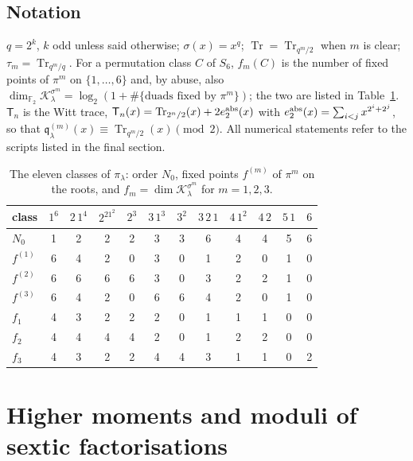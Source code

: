 \documentclass[12pt,a4paper]{amsart}
\theoremstyle{definition}
\newcommand{\F}{\mathbb{F}}
\newcommand{\Tr}{\operatorname{Tr}}
\newcommand{\Kk}{\mathcal{K}}
\newcommand{\qq}{\mathfrak{q}}
\newcommand{\Tw}{\mathsf{T}}
\begin{document}
\subsection{Notation}
$q=2^k$, $k$ odd unless said otherwise; $\sigma(x)=x^q$; $\Tr=\Tr_{q^m/2}$ when $m$ is clear; $\tau_m=\Tr_{q^m/q}$. For a permutation class $C$ of $S_6$, $f_m(C)$ is the number of fixed points of $\pi^m$ on $\{1,\dots,6\}$ and, by abuse, also $\dim_{\F_2}\Kk_\lambda^{\sigma^m}=\log_2(1+\#\{\text{duads fixed by }\pi^m\})$; the two are listed in Table~\ref{tab:classes}. $\Tw_n$ is the Witt trace, $\Tw_n(x)=\Tr_{2^n/2}(x)+2e_2^{\rm abs}(x)$ with $e_2^{\rm abs}(x)=\sum_{i<j}x^{2^i+2^j}$, so that $\qq^{(m)}_\lambda(x)\equiv\Tr_{q^m/2}(x)\pmod 2$. All numerical statements refer to the scripts listed in the final section.

\begin{table}[htbp]
\centering
\caption{The eleven classes of $\pi_\lambda$: order $N_0$, fixed points $f^{(m)}$ of $\pi^m$ on the roots, and $f_m=\dim\Kk_\lambda^{\sigma^m}$ for $m=1,2,3$.}\label{tab:classes}
\small
\begin{tabular}{@{}lccccccccccc@{}}
\toprule
class & $1^6$ & $2\,1^4$ & $2^21^2$ & $2^3$ & $3\,1^3$ & $3^2$ & $3\,2\,1$ & $4\,1^2$ & $4\,2$ & $5\,1$ & $6$\\
\midrule
$N_0$ & 1&2&2&2&3&3&6&4&4&5&6\\
$f^{(1)}$ &6&4&2&0&3&0&1&2&0&1&0\\
$f^{(2)}$ &6&6&6&6&3&0&3&2&2&1&0\\
$f^{(3)}$ &6&4&2&0&6&6&4&2&0&1&0\\
$f_1$ &4&3&2&2&2&0&1&1&1&0&0\\
$f_2$ &4&4&4&4&2&0&1&2&2&0&0\\
$f_3$ &4&3&2&2&4&4&3&1&1&0&2\\
\bottomrule
\end{tabular}
\end{table}

\section{Higher moments and moduli of sextic factorisations}\label{sec:moments}
\end{document}

